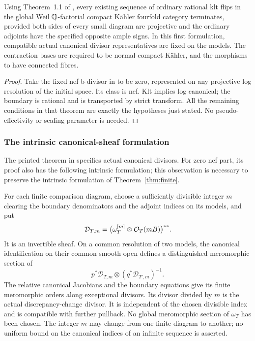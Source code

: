 \begin{corollary}\label{repair:cor:existing}
Using Theorem~1.1 of \cite{OAI:Termination-of-generalized-log-canonical-flips-on-compact-Kahler-fourfolds-October-5-2026}, every existing sequence of ordinary
rational klt flips in the global Weil $\mathbb Q$-factorial compact K\"ahler
fourfold category terminates, provided both sides of every small
diagram are projective and the ordinary adjoints have the specified
opposite ample signs. In this first formulation, compatible actual
canonical divisor representatives are fixed on the models. The contraction
bases are required to be normal compact K\"ahler, and the morphisms to
have connected fibres.
\end{corollary}
\begin{proof}
Take the fixed nef b-divisor in \cite{OAI:Termination-of-generalized-log-canonical-flips-on-compact-Kahler-fourfolds-October-5-2026} to be zero, represented on
any projective log resolution of the initial space. Its class is nef.
Klt implies log canonical;
the boundary is rational and is transported by strict transform. All
the remaining conditions in that theorem are exactly the hypotheses
just stated. No pseudo-effectivity or scaling parameter is needed.
\end{proof}

\subsubsection{The intrinsic canonical-sheaf formulation}
The printed theorem in \cite{OAI:Termination-of-generalized-log-canonical-flips-on-compact-Kahler-fourfolds-October-5-2026} specifies actual canonical divisors.
For zero nef part, its proof also has the following intrinsic
formulation; this observation is necessary to preserve the intrinsic
formulation of Theorem~\ref{thm:finite}.

For each finite comparison diagram, choose a sufficiently divisible
integer $m$ clearing the boundary denominators and the adjoint indices
on its models, and put
\[
 \mathcal D_{T,m}
   =\bigl(\omega_T^{[m]}\otimes\mathcal O_T(mB)\bigr)^{**}.
\]
It is an invertible sheaf. On a common resolution of two models, the
canonical identification on their common smooth open defines a
distinguished meromorphic section of
\[
 p^*\mathcal D_{T,m}\otimes(q^*\mathcal D_{T',m})^{-1}.
\]
The relative canonical Jacobians and the boundary equations give its
finite meromorphic orders along exceptional divisors. Its divisor
divided by $m$ is the actual discrepancy-change divisor. It is
independent of the chosen divisible index and is compatible with
further pullback. No global meromorphic section of $\omega_T$ has
been chosen. The integer $m$ may change from one finite diagram to
another; no uniform bound on the canonical indices of an infinite
sequence is asserted.

